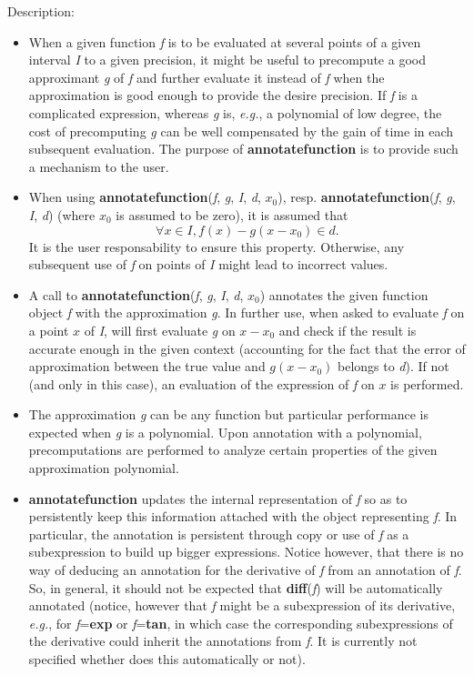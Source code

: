 \noindent Description: \begin{itemize}

\item When a given function \emph{f} is to be evaluated at several points of a given
   interval \emph{I} to a given precision, it might be useful to precompute a good
   approximant \emph{g} of \emph{f} and further evaluate it instead of \emph{f} when the
   approximation is good enough to provide the desire precision. If \emph{f} is a
   complicated expression, whereas \emph{g} is, \emph{e.g.}, a polynomial of low degree,
   the cost of precomputing \emph{g} can be well compensated by the gain of time in
   each subsequent evaluation. The purpose of \textbf{annotatefunction} is to provide
   such a mechanism to the user.

\item When using \textbf{annotatefunction}(\emph{f}, \emph{g}, \emph{I}, \emph{d}, \emph{$x_0$}),
   resp. \textbf{annotatefunction}(\emph{f}, \emph{g}, \emph{I}, \emph{d}) (where \emph{$x_0$} is assumed to be
   zero), it is assumed that
   $$\forall x \in I, f(x) - g(x - x_0) \in d.$$
   It is the user responsability to ensure this property. Otherwise, any
   subsequent use of \emph{f} on points of \emph{I} might lead to incorrect values.

\item A call to \textbf{annotatefunction}(\emph{f}, \emph{g}, \emph{I}, \emph{d}, \emph{$x_0$}) annotates the given
   \sollya function object \emph{f} with the approximation \emph{g}. In further use, when
   asked to evaluate \emph{f} on a point $x$ of \emph{I}, \sollya will first evaluate \emph{g}
   on $x-x_0$ and check if the result is accurate enough in the given context
   (accounting for the fact that the error of approximation between the true
   value and $g(x-x_0)$ belongs to \emph{d}). If not (and only in this case), an
   evaluation of the expression of \emph{f} on $x$ is performed.

\item The approximation \emph{g} can be any \sollya function but particular
   performance is expected when \emph{g} is a polynomial. Upon annotation with a
   polynomial, precomputations are performed to analyze certain properties of
   the given approximation polynomial.

\item \textbf{annotatefunction} updates the internal representation of \emph{f} so as to
   persistently keep this information attached with the \sollya object
   representing \emph{f}. In particular, the annotation is persistent through copy
   or use of \emph{f} as a subexpression to build up bigger expressions. Notice
   however, that there is no way of deducing an annotation for the derivative
   of \emph{f} from an annotation of \emph{f}. So, in general, it should not be expected
   that \textbf{diff}(\emph{f}) will be automatically annotated (notice, however that \emph{f}
   might be a subexpression of its derivative, \emph{e.g.}, for \emph{f}=\textbf{exp} or \emph{f}=\textbf{tan}, in
   which case the corresponding subexpressions of the derivative could inherit
   the annotations from \emph{f}. It is currently not specified whether \sollya does
   this automatically or not).


\end{itemize}
